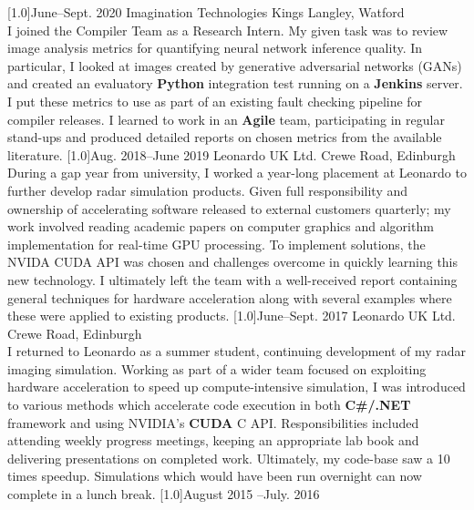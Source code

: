 \documentclass[]{cv-style}     %
\begin{document}
\begin{entrylist}
{\begin{itemize}
\end{itemize}
}
\entry
  {\scalebox{.8}[1.0]{June--Sept.  2020}}
  {Imagination Technologies}
  {Kings Langley, Watford}
  {\\
 I joined the Compiler Team as a Research Intern. My given task was to review image analysis metrics for quantifying neural network inference quality. In particular, I looked at images created by generative adversarial networks (GANs) and created an evaluatory \textbf{Python} integration test running on a \textbf{Jenkins} server. I put these metrics to use as part of an existing fault checking pipeline for compiler releases. I learned to work in an \textbf{Agile} team, participating in regular stand-ups and produced detailed reports on chosen metrics from the available literature. 
 }
\entry
  {\scalebox{.8}[1.0]{Aug. 2018--June 2019}}
  {Leonardo UK Ltd.}
  {Crewe Road, Edinburgh}
  {\\
  During a gap year from university, I worked a year-long placement at Leonardo to further develop radar simulation products. Given full responsibility and ownership of accelerating software released to external customers quarterly; my work involved reading academic papers on computer graphics and algorithm implementation for real-time GPU processing. To implement solutions, the NVIDA CUDA API was chosen and challenges overcome in quickly learning this new technology. I ultimately left the team with a well-received report containing  general techniques for hardware acceleration along with several examples where these were applied to existing products.
}
\entry
  {\scalebox{.8}[1.0]{June--Sept. 2017}}
  {Leonardo UK Ltd.}
  {Crewe Road, Edinburgh}
  {\\
 I returned to Leonardo as a summer student, continuing development of my radar imaging simulation. Working as part of a wider team focused on exploiting hardware acceleration to speed up compute-intensive simulation, I was introduced to various methods which accelerate code execution in both \textbf{C\#/.NET} framework and using NVIDIA's \textbf{CUDA} C API. Responsibilities included attending weekly progress meetings, keeping an appropriate lab book and delivering presentations on completed work.
 Ultimately, my code-base saw a 10 times speedup. Simulations which would have been run overnight can now complete in a lunch break.
}
\entry
  {\scalebox{.8}[1.0]{August 2015 --July.  2016}}

\end{entrylist}
\end{document}
